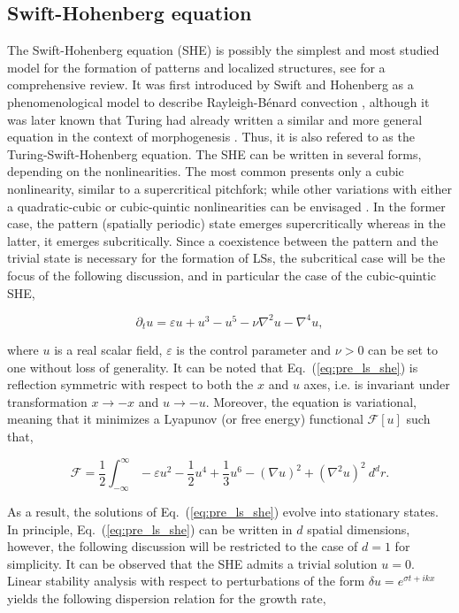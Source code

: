 \subsection{Swift-Hohenberg equation}

The Swift-Hohenberg equation (SHE) is possibly the simplest and most studied model 
for the formation of patterns and localized structures, see \cite{cross1993pattern,knobloch2015spatial}
for a comprehensive review. It was first introduced
by Swift and Hohenberg as a phenomenological model to describe Rayleigh-Bénard
convection \cite{swift1977hydrodynamic,pomeau1979stability}, although it was later 
known that Turing had already written 
a similar and more general equation in the context of morphogenesis \cite{dawes2016after}.
Thus, it is also refered to as the Turing-Swift-Hohenberg equation.
The SHE can be written in several forms, depending on the nonlinearities. The most common
presents only a cubic nonlinearity, similar to a supercritical pitchfork; while other
variations with either a quadratic-cubic or cubic-quintic nonlinearities can be envisaged \cite{burke2007snakes,knobloch2015spatial}.
In the former case, the pattern (spatially periodic) state emerges supercritically whereas in the latter,
it emerges subcritically. Since a coexistence between the pattern and the trivial state is necessary for the formation of LSs,
the subcritical case will be the focus of the following discussion, and in particular the case of 
the cubic-quintic SHE,

\begin{equation}
    \partial_t u = \varepsilon u + u ^3 - u^5 - \nu \nabla^2 u - \nabla^4 u,
    \label{eq:pre_ls_she}
\end{equation}

\noindent where $u$ is a real scalar field, $\varepsilon$ is the control parameter and $\nu>0$ can be set to
one without loss of generality. It can be noted that Eq.~(\ref{eq:pre_ls_she}) is reflection symmetric
with respect to both the $x$ and $u$ axes, i.e. is invariant under transformation $x\to -x$ and $u\to -u$.
Moreover, the equation is variational, meaning that it minimizes a Lyapunov (or free energy) functional
$\mathcal{F}[u]$ such that,

\begin{equation}
    \mathcal{F} = \dfrac12 \int_{-\infty}^{\infty} -\varepsilon u^2 - \dfrac12 u^4 + \dfrac13 u^6 - (\nabla u)^2 + (\nabla^2 u)^2 \ d^dr.
\end{equation}

As a result, the solutions of Eq.~(\ref{eq:pre_ls_she}) evolve into stationary states.
In principle, Eq.~(\ref{eq:pre_ls_she}) can be written in 
$d$ spatial dimensions, however, the following discussion will be restricted to the case of $d=1$ for simplicity.
It can be observed that the SHE admits a trivial solution $u=0$. Linear
stability analysis with respect to perturbations of the form $\delta u = e^{\sigma t + ikx}$ yields
the following dispersion relation for the growth rate,

